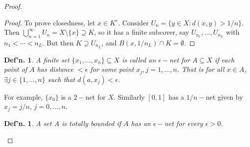\documentclass[12pt, a4paper]{book}
\newtheorem{definition}[theorem]{Def'n.}
\theoremstyle{nonumberplain}
\newtheorem{proof}{Proof}
\begin{document}
\begin{proof}
\begin{proof}
    To prove closedness, let $x\in K^c$. Consider $U_n=\{y\in X:d(x,y)>1/n\}$. Then $\bigcup_{n=1}^\infty U_n=X\setminus\{x\}\supseteq K$,
    so it has a finite subcover, say $U_{n_1},\ldots,U_{n_L}$ with $n_1<\cdots<n_L$. But then $K\supseteq U_{n_L}$, and
    $B(x,1/n_L)\cap K=\emptyset$.
\end{proof}
\begin{definition}
    A finite set $\{x_1,\ldots,x_n\}\subseteq X$ is called an \textit{$\epsilon-$net for $A\subseteq X$} if each point of
    $A$ has distance $<\epsilon$ for some point $x_j,j=1,\ldots,n$. That is for all $x\in A$, $\exists j\in\{1,\ldots,n\}$
    such that $d(a,x_j)<\epsilon$.
\end{definition}
For example, $\{x_0\}$ is a $2-$net for $X$. Similarly $[0,1]$ has a $1/n-$net given by $x_j=j/n$, $j=0,\ldots,n$.
\begin{definition}
    A set $A$ is totally bounded if $A$ has an $\epsilon-$net for every $\epsilon>0$.
\end{definition}

\end{proof}
\end{document}
